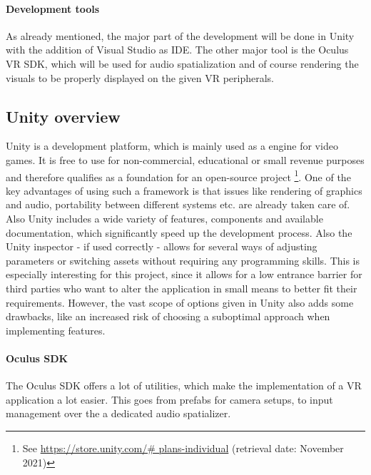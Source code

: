 \documentclass[a4paper,11pt]{article}%
\renewcommand{\\}{\vspace*{0.5\baselineskip} \newline}
\begin{document}
\paragraph{Development tools} As already mentioned, the major part of the development will be done in Unity with the addition of Visual Studio as \ac{IDE}. The other major tool is the Oculus \ac{VR} \ac{SDK}, which will be used for audio spatialization and of course rendering the visuals to be properly displayed on the given \ac{VR} peripherals.


\subsection{Unity overview}
\label{sec:unity}
Unity is a development platform, which is mainly used as a engine for video games. It is free to use for non-commercial, educational or small revenue purposes and therefore qualifies as a foundation for an open-source project \footnote{See \url{https://store.unity.com/\# plans-individual} (retrieval date: November 2021)}. One of the key advantages of using such a framework is that issues like rendering of graphics and audio, portability between different systems etc. are already taken care of. Also Unity includes a wide variety of features, components and available documentation, which significantly speed up the development process. Also the Unity inspector - if used correctly - allows for several ways of adjusting parameters or switching assets without requiring any programming skills. This is especially interesting for this project, since it allows for a low entrance barrier for third parties who want to alter the application in small means to better fit their requirements. However, the vast scope of options given in Unity also adds some drawbacks, like an increased risk of choosing a suboptimal approach when implementing features.

\paragraph{Oculus SDK} The Oculus \acs{SDK} offers a lot of utilities, which make the implementation of a \ac{VR} application a lot easier. This goes from prefabs for camera setups, to input management over the a dedicated audio spatializer.
\end{document}
